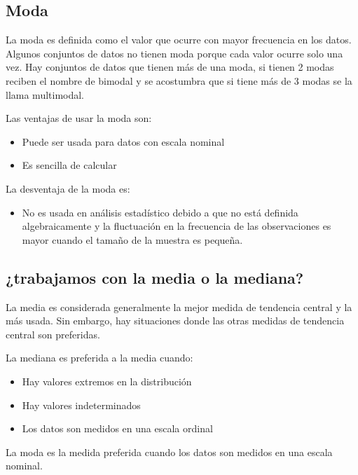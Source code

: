 \documentclass[]{book}
\providecommand{\tightlist}{%
  \setlength{\itemsep}{0pt}\setlength{\parskip}{0pt}}
\begin{document}
\hypertarget{moda}{%
\subsection{Moda}\label{moda}}

La moda es definida como el valor que ocurre con mayor frecuencia en los datos. Algunos conjuntos de datos no tienen moda porque cada valor ocurre solo una vez. Hay conjuntos de datos que tienen más de una moda, si tienen 2 modas reciben el nombre de bimodal y se acostumbra que si tiene más de 3 modas se la llama multimodal.

Las ventajas de usar la moda son:

\begin{itemize}
\tightlist
\item
  Puede ser usada para datos con escala nominal
\item
  Es sencilla de calcular
\end{itemize}

La desventaja de la moda es:

\begin{itemize}
\tightlist
\item
  No es usada en análisis estadístico debido a que no está definida algebraicamente y la fluctuación en la frecuencia de las observaciones es mayor cuando el tamaño de la muestra es pequeña.
\end{itemize}

\hypertarget{trabajamos-con-la-media-o-la-mediana}{%
\subsection{¿trabajamos con la media o la mediana?}\label{trabajamos-con-la-media-o-la-mediana}}

La media es considerada generalmente la mejor medida de tendencia central y la más usada. Sin embargo, hay situaciones donde las otras medidas de tendencia central son preferidas.

La mediana es preferida a la media cuando:

\begin{itemize}
\tightlist
\item
  Hay valores extremos en la distribución
\item
  Hay valores indeterminados
\item
  Los datos son medidos en una escala ordinal
\end{itemize}

La moda es la medida preferida cuando los datos son medidos en una escala nominal.
\end{document}
